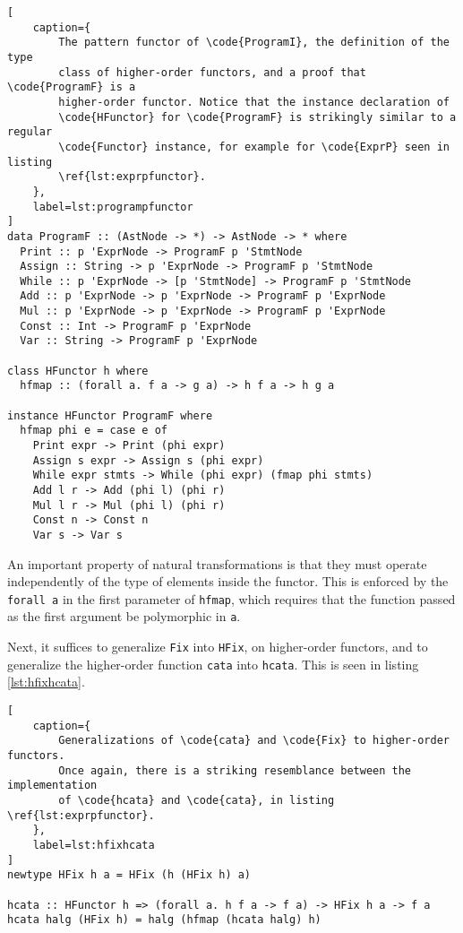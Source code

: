 \documentclass[letterpaper,11pt]{article}
\newcommand{\code}{\texttt}
\begin{document}
\begin{lstlisting}[
    caption={
        The pattern functor of \code{ProgramI}, the definition of the type
        class of higher-order functors, and a proof that \code{ProgramF} is a
        higher-order functor. Notice that the instance declaration of
        \code{HFunctor} for \code{ProgramF} is strikingly similar to a regular
        \code{Functor} instance, for example for \code{ExprP} seen in listing
        \ref{lst:exprpfunctor}.
    },
    label=lst:programpfunctor
]
data ProgramF :: (AstNode -> *) -> AstNode -> * where
  Print :: p 'ExprNode -> ProgramF p 'StmtNode
  Assign :: String -> p 'ExprNode -> ProgramF p 'StmtNode
  While :: p 'ExprNode -> [p 'StmtNode] -> ProgramF p 'StmtNode
  Add :: p 'ExprNode -> p 'ExprNode -> ProgramF p 'ExprNode
  Mul :: p 'ExprNode -> p 'ExprNode -> ProgramF p 'ExprNode
  Const :: Int -> ProgramF p 'ExprNode
  Var :: String -> ProgramF p 'ExprNode

class HFunctor h where
  hfmap :: (forall a. f a -> g a) -> h f a -> h g a

instance HFunctor ProgramF where
  hfmap phi e = case e of
    Print expr -> Print (phi expr)
    Assign s expr -> Assign s (phi expr)
    While expr stmts -> While (phi expr) (fmap phi stmts)
    Add l r -> Add (phi l) (phi r)
    Mul l r -> Mul (phi l) (phi r)
    Const n -> Const n
    Var s -> Var s
\end{lstlisting}

An important property of natural transformations is that they must operate
independently of the type of elements inside the functor. This is enforced by
the \code{forall a} in the first parameter of \code{hfmap}, which requires that
the function passed as the first argument be polymorphic in \code{a}.

Next, it suffices to generalize \code{Fix} into \code{HFix}, on higher-order
functors, and to generalize the higher-order function \code{cata} into
\code{hcata}. This is seen in listing \ref{lst:hfixhcata}.

\begin{lstlisting}[
    caption={
        Generalizations of \code{cata} and \code{Fix} to higher-order functors.
        Once again, there is a striking resemblance between the implementation
        of \code{hcata} and \code{cata}, in listing \ref{lst:exprpfunctor}.
    },
    label=lst:hfixhcata
]
newtype HFix h a = HFix (h (HFix h) a)

hcata :: HFunctor h => (forall a. h f a -> f a) -> HFix h a -> f a
hcata halg (HFix h) = halg (hfmap (hcata halg) h)
\end{lstlisting}
\end{document}
